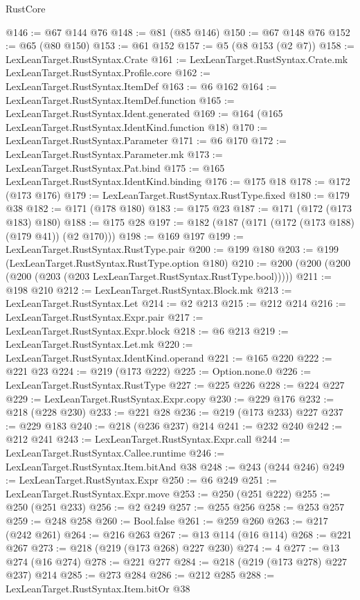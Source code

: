 \begin{lexlean}{RustCore}
\begin{coremodule}
@146 := @67 @144 @76
@148 := @81 (@85 @146)
@150 := @67 @148 @76
@152 := @65 (@80 @150)
@153 := @61 @152
@157 := @5 (@8 @153 (@2 @7))
@158 := LexLeanTarget.RustSyntax.Crate
@161 := LexLeanTarget.RustSyntax.Crate.mk LexLeanTarget.RustSyntax.Profile.core
@162 := LexLeanTarget.RustSyntax.ItemDef
@163 := @6 @162
@164 := LexLeanTarget.RustSyntax.ItemDef.function
@165 := LexLeanTarget.RustSyntax.Ident.generated
@169 := @164 (@165 LexLeanTarget.RustSyntax.IdentKind.function @18)
@170 := LexLeanTarget.RustSyntax.Parameter
@171 := @6 @170
@172 := LexLeanTarget.RustSyntax.Parameter.mk
@173 := LexLeanTarget.RustSyntax.Pat.bind
@175 := @165 LexLeanTarget.RustSyntax.IdentKind.binding
@176 := @175 @18
@178 := @172 (@173 @176)
@179 := LexLeanTarget.RustSyntax.RustType.fixed
@180 := @179 @38
@182 := @171 (@178 @180)
@183 := @175 @23
@187 := @171 (@172 (@173 @183) @180)
@188 := @175 @28
@197 := @182 (@187 (@171 (@172 (@173 @188) (@179 @41)) (@2 @170)))
@198 := @169 @197
@199 := LexLeanTarget.RustSyntax.RustType.pair
@200 := @199 @180
@203 := @199 (LexLeanTarget.RustSyntax.RustType.option @180)
@210 := @200 (@200 (@200 (@200 (@203 (@203 LexLeanTarget.RustSyntax.RustType.bool)))))
@211 := @198 @210
@212 := LexLeanTarget.RustSyntax.Block.mk
@213 := LexLeanTarget.RustSyntax.Let
@214 := @2 @213
@215 := @212 @214
@216 := LexLeanTarget.RustSyntax.Expr.pair
@217 := LexLeanTarget.RustSyntax.Expr.block
@218 := @6 @213
@219 := LexLeanTarget.RustSyntax.Let.mk
@220 := LexLeanTarget.RustSyntax.IdentKind.operand
@221 := @165 @220
@222 := @221 @23
@224 := @219 (@173 @222)
@225 := Option.none.{0}
@226 := LexLeanTarget.RustSyntax.RustType
@227 := @225 @226
@228 := @224 @227
@229 := LexLeanTarget.RustSyntax.Expr.copy
@230 := @229 @176
@232 := @218 (@228 @230)
@233 := @221 @28
@236 := @219 (@173 @233) @227
@237 := @229 @183
@240 := @218 (@236 @237) @214
@241 := @232 @240
@242 := @212 @241
@243 := LexLeanTarget.RustSyntax.Expr.call
@244 := LexLeanTarget.RustSyntax.Callee.runtime
@246 := LexLeanTarget.RustSyntax.Item.bitAnd @38
@248 := @243 (@244 @246)
@249 := LexLeanTarget.RustSyntax.Expr
@250 := @6 @249
@251 := LexLeanTarget.RustSyntax.Expr.move
@253 := @250 (@251 @222)
@255 := @250 (@251 @233)
@256 := @2 @249
@257 := @255 @256
@258 := @253 @257
@259 := @248 @258
@260 := Bool.false
@261 := @259 @260
@263 := @217 (@242 @261)
@264 := @216 @263
@267 := @13 @114 (@16 @114)
@268 := @221 @267
@273 := @218 (@219 (@173 @268) @227 @230)
@274 := 4
@277 := @13 @274 (@16 @274)
@278 := @221 @277
@284 := @218 (@219 (@173 @278) @227 @237) @214
@285 := @273 @284
@286 := @212 @285
@288 := LexLeanTarget.RustSyntax.Item.bitOr @38

\end{coremodule}
\end{lexlean}
